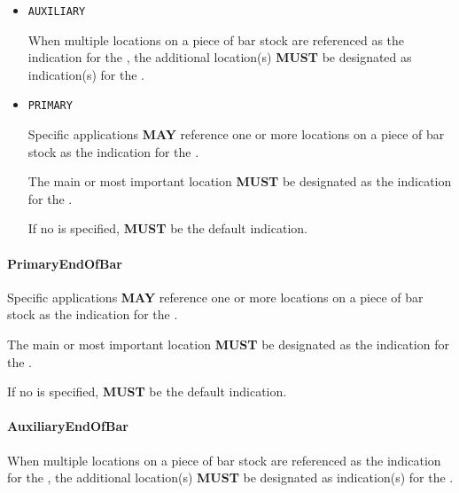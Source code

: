 \begin{itemize}

\item \texttt{AUXILIARY}


When multiple locations on a piece of bar stock are referenced as the indication for the , the additional location(s) \textbf{MUST} be designated as  indication(s) for the .  

\item \texttt{PRIMARY}


Specific applications \textbf{MAY} reference one or more locations on a piece of bar stock as the indication for the . 

The main or most important location \textbf{MUST} be designated as the  indication for the .

If no  is specified,  \textbf{MUST} be the default  indication.


\end{itemize}

\paragraph{PrimaryEndOfBar}\mbox{}
\label{sec:PrimaryEndOfBar}


Specific applications \textbf{MAY} reference one or more locations on a piece of bar stock as the indication for the . 

The main or most important location \textbf{MUST} be designated as the  indication for the .

If no  is specified,  \textbf{MUST} be the default  indication.


\paragraph{AuxiliaryEndOfBar}\mbox{}
\label{sec:AuxiliaryEndOfBar}


When multiple locations on a piece of bar stock are referenced as the indication for the , the additional location(s) \textbf{MUST} be designated as  indication(s) for the .  


